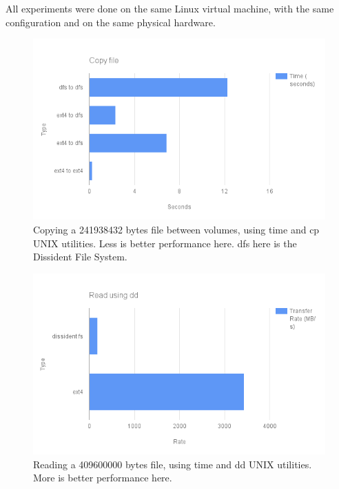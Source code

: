 \documentclass[10pt,twocolumn]{article}
\begin{document}
All experiments were done on the same Linux virtual machine, with the same configuration and on the same physical hardware. 


\begin{figure}[thpb]
  \centering
  	\includegraphics[width=\columnwidth]{cp}
    \caption{Copying a 241938432 bytes file between volumes, using time and cp UNIX utilities. Less is better performance here. dfs here is the Dissident File System. }
	\label{fig:cp}
\end{figure}

\begin{figure}[thpb]
  \centering
  	\includegraphics[width=\columnwidth]{dd_read}
    \caption{Reading a 409600000 bytes file, using time and dd UNIX utilities. More is better performance here.}
	\label{fig:ddread}
\end{figure}
\end{document}
